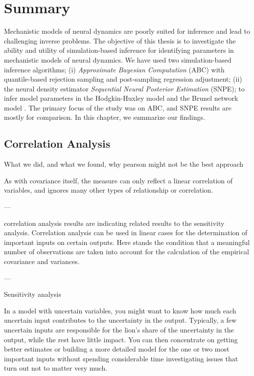 \chapter{Summary}\label{chap:summary}

Mechanistic models of neural dynamics are poorly suited for inference and lead to challenging inverse problems. The objective of this thesis is to investigate the ability and utility of simulation-based inference for identifying parameters in mechanistic models of neural dynamics. We have used two simulation-based inference algorithms; (i) \textit{Approximate Bayesian Computation} (ABC) with quantile-based rejection sampling and post-sampling regression adjustment; (ii) the neural density estimator \textit{Sequential Neural Posterior Estimation} (SNPE); to infer model parameters in the Hodgkin-Huxley model \cite{HH1952} and the Brunel network model \cite{Brunel2000}. The primary focus of the study was on ABC, and SNPE results are mostly for comparison. In this chapter, we summarize our findings. 

\section{Correlation Analysis}

What we did, and what we found, why pearson might not be the best approach

As with covariance itself, the measure can only reflect a linear correlation of variables, and ignores many other types of relationship or correlation. 

---

correlation analysis results are indicating related results to the sensitivity analysis. Correlation analysis can be used in linear cases for the determination of important inputs on certain outputs. Here stands the condition that a meaningful number of observations are taken into account for the calculation of the empirical covariance and variances.

---

Sensitivity analysis

In a model with uncertain variables, you might want to know how much each uncertain input contributes to the uncertainty in the output. Typically, a few uncertain inputs are responsible for the lion’s share of the uncertainty in the output, while the rest have little impact. You can then concentrate on getting better estimates or building a more detailed model for the one or two most important inputs without spending considerable time investigating issues that turn out not to matter very much.

